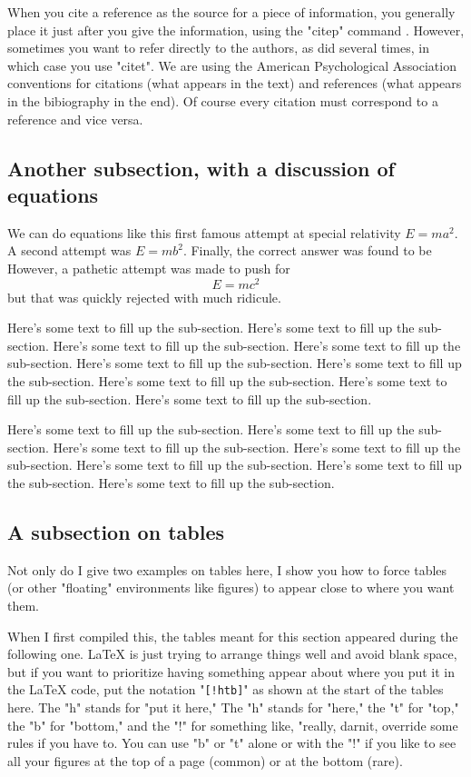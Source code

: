 \documentclass[11pt]{ucscthesisbs}
\begin{document}
When you cite a reference as the source for a piece of information,
you generally place it just after you give the information, using the "citep"
command \citep{awwzml06}.  However, sometimes you want to refer directly to 
the authors, as \citet{agcs89} did several times, in which case you use "citet".
We are using the American Psychological Association conventions for citations
(what appears in the text) and references (what appears in the bibiography in
the end).  Of course every citation must correspond to a reference and vice versa.

\subsection{Another subsection, with a discussion of equations}\label{subsection_equations}

We can do equations like this first famous attempt
at special relativity $E=ma^2$.  A second attempt
was $E=mb^2$.  Finally, the correct answer was found
to be
However, a pathetic attempt was made to push
for
\begin{equation}
E=mc^{2}
\end{equation}
\noindent but that was quickly rejected with much ridicule.

Here's some text to fill up the sub-section.
Here's some text to fill up the sub-section.
Here's some text to fill up the sub-section.
Here's some text to fill up the sub-section.
Here's some text to fill up the sub-section.
Here's some text to fill up the sub-section.
Here's some text to fill up the sub-section.
Here's some text to fill up the sub-section.
Here's some text to fill up the sub-section.

Here's some text to fill up the sub-section.
Here's some text to fill up the sub-section.
Here's some text to fill up the sub-section.
Here's some text to fill up the sub-section.
Here's some text to fill up the sub-section.
Here's some text to fill up the sub-section.
Here's some text to fill up the sub-section.


\subsection{A subsection on tables}\label{tables}

Not only do I give two examples on tables here, I show you how to force tables (or other "floating" environments like figures) to appear close to where you want them.

When I first compiled this, the tables meant for this section appeared during the following one.  LaTeX is just trying to arrange things well and avoid blank space, but if you want to prioritize having something appear about where you put it in the LaTeX code, put the notation 
"{\tt [!htb]}" as shown at the start of the tables here.  The "h" stands for "put it here,"  The "h" stands for "here," the "t" for "top," the "b" for "bottom," and the "!" for something like, "really, darnit, override some rules if you have to.  You can use "b" or "t" alone or with the "!" if you like to see all your figures at the top of a page (common) or at the bottom (rare).  
\end{document}
